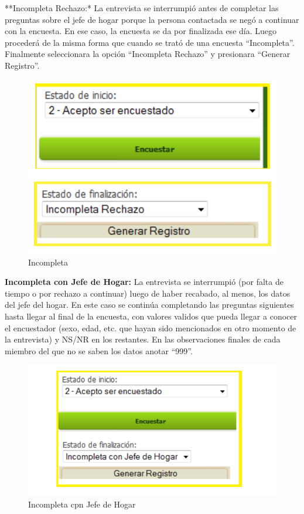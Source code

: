 \documentclass[
  openany]{book}
\begin{document}
**Incompleta Rechazo:* La entrevista se interrumpió antes de completar las preguntas sobre el jefe de hogar porque la persona contactada se negó a continuar con la encuesta. En ese caso, la encuesta se da por finalizada ese día. Luego procederá de la misma forma que cuando se trató de una encuesta ``Incompleta''. Finalmente seleccionara la opción ``Incompleta Rechazo'' y presionara ``Generar Registro''.

\begin{figure}

{\centering \includegraphics[width=1\linewidth]{imagenes/figura6-39} 

}

\caption{Incompleta}\label{fig:fin1}
\end{figure}

\textbf{Incompleta con Jefe de Hogar:} La entrevista se interrumpió (por falta de tiempo o por rechazo a continuar) luego de haber recabado, al menos, los datos del jefe del hogar. En este caso se continúa completando las preguntas siguientes hasta llegar al final de la encuesta, con valores validos que pueda llegar a conocer el encuestador (sexo, edad, etc. que hayan sido mencionados en otro momento de la entrevista) y NS/NR en los restantes. En las observaciones finales de cada miembro del que no se saben los datos anotar ``999''.

\begin{figure}

{\centering \includegraphics[width=1\linewidth]{imagenes/figura6-40} 

}

\caption{Incompleta cpn Jefe de Hogar}\label{fig:fin2}
\end{figure}
\end{document}
